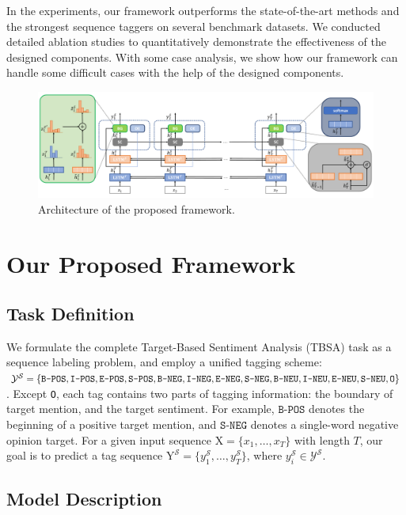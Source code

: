 \documentclass[letterpaper]{article}
\begin{document}
In the experiments, our framework outperforms the state-of-the-art methods and the strongest sequence taggers on several benchmark datasets. We conducted detailed ablation studies to quantitatively demonstrate the effectiveness of the designed components. With some case analysis, we show how our framework can handle some difficult cases with the help of the designed components.

\begin{figure}
    \centering
    \includegraphics[width=1\textwidth]{architecture_v8.pdf}
    \caption{Architecture of the proposed framework.}
    \label{fig:architecture}
\end{figure}


\section{Our Proposed Framework}
\subsection{Task Definition}

We formulate the complete Target-Based Sentiment Analysis (TBSA) task as a sequence labeling problem, and employ a unified tagging scheme: $\mathcal{Y}^{\mathcal{S}} = \{\texttt{B-POS},\texttt{I-POS},\texttt{E-POS}, \texttt{S-POS}, \texttt{B-NEG},\texttt{I-NEG},\texttt{E-NEG},\\ \texttt{S-NEG}, \texttt{B-NEU},\texttt{I-NEU},\texttt{E-NEU}, \texttt{S-NEU}, \texttt{O}\}$.
Except \texttt{O}, each tag contains two parts of tagging information: the boundary of target mention, and the target sentiment. For example, $\texttt{B-POS}$ denotes the beginning of a positive target mention, and $\texttt{S-NEG}$ denotes a single-word negative opinion target.
For a given input sequence $\mathrm{ X}=\{x_1,\dots,x_T\}$ with length $T$, our goal is to predict a tag sequence $\mathrm{ Y}^{\mathcal{S}}=\{y^{\mathcal{S}}_1,\dots,y^{\mathcal{S}}_T\}$, where $y^{\mathcal{S}}_i \in \mathcal{Y}^{\mathcal{S}}$.


\subsection{Model Description}
\end{document}

